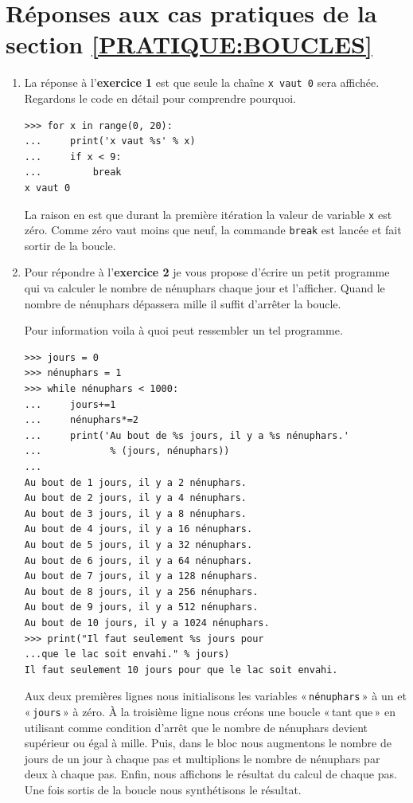 \section{Réponses aux cas pratiques de la section  \ref{PRATIQUE:BOUCLES}\label{REPONSES:BOUCLES}}
\begin{enumerate}
\item La réponse à l'\textbf{exercice 1} est que seule la chaîne \texttt{x vaut 0} sera affichée. Regardons le code en détail pour comprendre pourquoi.
\begin{Verbatim}[frame=single,rulecolor=\color{gray}, label=ne pas taper]
>>> for x in range(0, 20):
... 	print('x vaut %s' % x)
... 	if x < 9:
... 		break
x vaut 0
\end{Verbatim}

La raison en est que durant la première itération la valeur de variable \texttt{x} est zéro. Comme zéro vaut moins que neuf, la commande \texttt{break} est lancée et fait sortir de la boucle.

\item Pour répondre à l'\textbf{exercice 2} je vous propose d'écrire un petit programme qui va calculer le nombre de nénuphars chaque jour et l'afficher. Quand le nombre de nénuphars dépassera mille il suffit d'arrêter la boucle.

Pour information voila à quoi peut ressembler un tel programme.
\begin{Verbatim}[frame=single,rulecolor=\color{gray}, label=ne pas taper]
>>> jours = 0
>>> nénuphars = 1
>>> while nénuphars < 1000:
...     jours+=1
...     nénuphars*=2 
...     print('Au bout de %s jours, il y a %s nénuphars.' 
...            % (jours, nénuphars))
... 
Au bout de 1 jours, il y a 2 nénuphars.
Au bout de 2 jours, il y a 4 nénuphars.
Au bout de 3 jours, il y a 8 nénuphars.
Au bout de 4 jours, il y a 16 nénuphars.
Au bout de 5 jours, il y a 32 nénuphars.
Au bout de 6 jours, il y a 64 nénuphars.
Au bout de 7 jours, il y a 128 nénuphars.
Au bout de 8 jours, il y a 256 nénuphars.
Au bout de 9 jours, il y a 512 nénuphars.
Au bout de 10 jours, il y a 1024 nénuphars.
>>> print("Il faut seulement %s jours pour 
...que le lac soit envahi." % jours)
Il faut seulement 10 jours pour que le lac soit envahi.
\end{Verbatim}

Aux deux premières lignes nous initialisons les variables « \verb+nénuphars+ » à un et « \verb+jours+ » à zéro.  
À la troisième ligne nous créons une boucle « tant que » en utilisant comme condition d'arrêt que le nombre de nénuphars devient supérieur ou égal à mille. Puis, dans le bloc nous augmentons le nombre de jours de un jour à chaque pas et multiplions le nombre de nénuphars par deux à chaque pas. Enfin, nous affichons le résultat du calcul de chaque pas. Une fois sortis de la boucle nous synthétisons le résultat. 
\end{enumerate}

